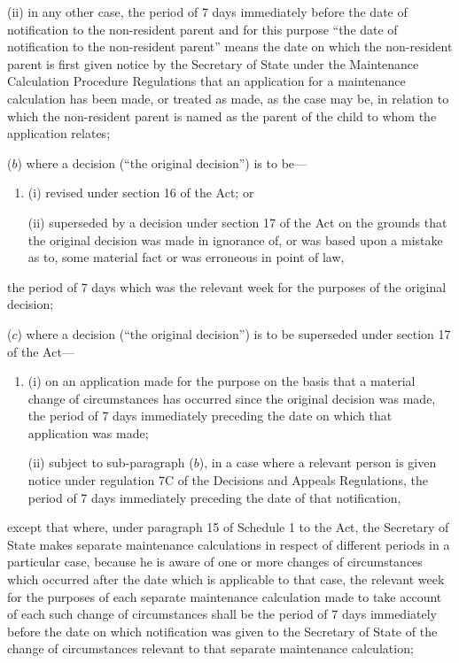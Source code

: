 \documentclass[12pt,a4paper]{article}
\begin{document}
\begin{enumerate}
\begin{enumerate}
\begin{enumerate}
(ii)
in any other case, the period of 7 days immediately before the date of notification to the non-resident parent and for this purpose “the date of notification to the non-resident parent” means the date on which the non-resident parent is first given notice by the Secretary of State under the Maintenance Calculation Procedure Regulations that an application for a maintenance calculation has been made, or treated as made, as the case may be, in relation to which the non-resident parent is named as the parent of the child to whom the application relates;
\end{enumerate}

($b$) 
where a decision (“the original decision”) is to be—
\begin{enumerate}\item[]
(i)
revised under section 16 of the Act; or

(ii)
superseded by a decision under section 17 of the Act on the grounds that the original decision was made in ignorance of, or was based upon a mistake as to, some material fact or was erroneous in point of law,
\end{enumerate}
the period of 7 days which was the relevant week for the purposes of the original decision;

($c$) 
where a decision (“the original decision”) is to be superseded under section 17 of the Act—
\begin{enumerate}\item[]
(i)
on an application made for the purpose on the basis that a material change of circumstances has occurred since the original decision was made, the period of 7 days immediately preceding the date on which that application was made;

(ii)
subject to sub-paragraph ($b$), in a case where a relevant person is given notice under regulation 7C of the Decisions and Appeals Regulations, the period of 7 days immediately preceding the date of that notification,
\end{enumerate}
except that where, under paragraph 15 of Schedule 1 to the Act, the Secretary of State makes separate maintenance calculations in respect of different periods in a particular case, because he is aware of one or more changes of circumstances which occurred after the date which is applicable to that case, the relevant week for the purposes of each separate maintenance calculation made to take account of each such change of circumstances shall be the period of 7 days immediately before the date on which notification was given to the Secretary of State of the change of circumstances relevant to that separate maintenance calculation;
\end{enumerate}


\end{enumerate}
\end{document}
